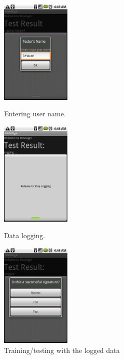 \documentclass[12pt]{article}
\begin{document}
\begin{figure}[ht]
\label{fig:gui}
\begin{minipage}[b]{0.33\textwidth}
\centering
\includegraphics[width=0.3\textwidth]{name}
\caption{Entering user name.}
\label{fig:name}
\end{minipage}
\begin{minipage}[b]{0.33\textwidth}
\centering
\includegraphics[width=0.3\textwidth]{logging}
\caption{Data logging.}
\label{fig:logging}
\end{minipage}
\begin{minipage}[b]{0.33\textwidth}
\centering
\includegraphics[width=0.3\textwidth]{checkbox}
\caption{Training/testing with the logged data}
\label{fig:checkbox}
\end{minipage}
\end{figure}
\end{document}
